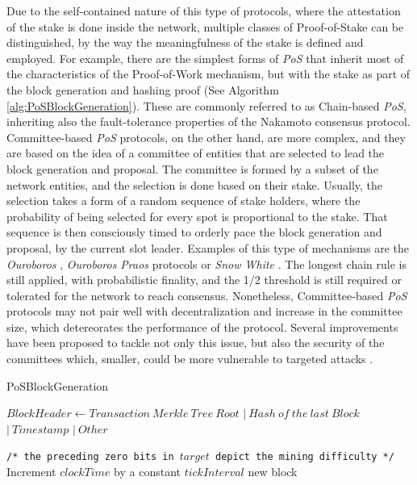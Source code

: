 \documentclass[journal]{IEEEtran}
\newcommand{\LineComment}[1]{\State \texttt{/* #1 */}}
\begin{document}
Due to the self-contained nature of this type of protocols, where the
attestation of the stake is done inside the network, multiple classes
of Proof-of-Stake can be distinguished, by the way the meaningfulness of
the stake is defined and employed. For example, there are the simplest forms of \emph{PoS} that inherit most
of the characteristics of the Proof-of-Work mechanism, but with the
stake as part of the block generation and hashing proof (See Algorithm \ref{alg:PoSBlockGeneration}).
These are commonly referred to as Chain-based \emph{PoS}, inheriting also the
fault-tolerance properties of the Nakamoto consensus protocol.
Committee-based \emph{PoS} protocols, on the other hand, are more complex,
and they are based on the idea of a committee of entities that are 
selected to lead the block generation and proposal. The committee is
formed by a subset of the network entities, and the selection is done
based on their stake. Usually, the selection takes a form of a random
sequence of stake holders, where the probability of being selected
for every spot is proportional to the stake. That sequence is then 
consciously timed to orderly pace the block generation and proposal, 
by the current slot leader. Examples of this type of mechanisms are
the \emph{Ouroboros} \cite{kiayias2017ouroboros}, \emph{Ouroboros Praos} \cite{david2018ouroboros} protocols
or \emph{Snow White} \cite{daian2019snow}. The longest chain rule is
still applied, with probabilistic finality, and the 1/2 threshold is
still required or tolerated for the network to reach consensus. Nonetheless,
Committee-based \emph{PoS} protocols may not pair well with decentralization and 
increase in the committee size, which detereorates the performance of the
protocol. Several improvements have been proposed to tackle not only this
issue, but also the security of the committees which, smaller, could be more
vulnerable to targeted attacks \cite{david2018ouroboros}.

\begin{algorithm}
  \caption[short]{PoSBlockGeneration}\label{alg:PoSBlockGeneration}
  \begin{algorithmic}[1]
    \Function {}{}
      \State $Block Header \gets Transaction \ Merkle \ Tree \ Root$
      \Indent
        \State $| \ Hash \ of \ the \ last \ Block$
        \State $| \ Timestamp$
        \State $| \ Other$
      \EndIndent
      
      \LineComment{the preceding zero bits in $target$ depict the mining difficulty}
      \State Increment $clockTime$ by a constant $tickInterval$
      \EndWhile
      \State \Return new block
    \EndFunction
  \end{algorithmic}
\end{algorithm}
  
\end{document}
